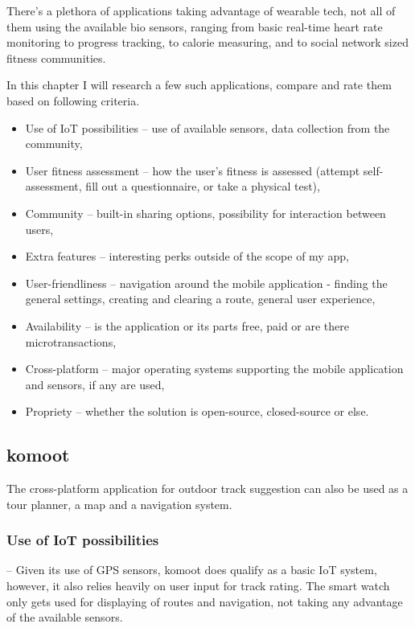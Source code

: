 There's a plethora of applications taking advantage of wearable tech, not all of them using the available bio sensors, ranging from basic real-time heart rate monitoring to progress tracking, to calorie measuring, and to social network sized fitness communities.

In this chapter I will research a few such applications, compare and rate them based on following criteria. 
\begin{itemize}
    \item Use of IoT possibilities -- use of available sensors, data collection from the community,
    \item User fitness assessment -- how the user's fitness is assessed (attempt self-assessment, fill out a questionnaire, or take a physical test),
    \item Community -- built-in sharing options, possibility for interaction between users,
    \item Extra features -- interesting perks outside of the scope of my app,
    \item User-friendliness -- navigation around the mobile application - finding the general settings, creating and clearing a route, general user experience,
    \item Availability -- is the application or its parts free, paid or are there microtransactions,
    \item Cross-platform -- major operating systems supporting the mobile application and sensors, if any are used,
    \item Propriety -- whether the solution is open-source, closed-source or else.
\end{itemize}


\subsection{komoot}
The cross-platform application for outdoor track suggestion can also be used as a tour planner, a map and a navigation system.


\subsubsection{Use of IoT possibilities} -- Given its use of GPS sensors, komoot does qualify as a basic IoT system, however, it also relies heavily on user input for track rating.
The smart watch only gets used for displaying of routes and navigation, not taking any advantage of the available sensors.
